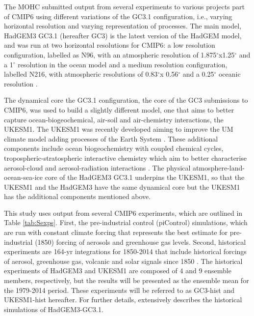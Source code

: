 The MOHC submitted output from several experiments to various projects part of CMIP6 using different variations of the GC3.1 configuration, i.e., varying horizontal resolution and varying representation of processes. 
The main model, HadGEM3 GC3.1 (hereafter GC3) is the latest version of the HadGEM model, and was run at two horizontal resolutions for CMIP6: a low resolution configuration, labelled as N96, with an atmospheric resolution of 1.875$^\circ$x1.25$^\circ$ and a 1$^\circ$ resolution in the ocean model and a medium resolution configuration, labelled N216, with atmospheric resolutions of 0.83$^\circ$x 0.56$^\circ$ and a 0.25$^\circ$ oceanic resolution \citep{menary2018}. 

The dynamical core the GC3.1 configuration, the core of the GC3 submissions to CMIP6, was used to build a slightly different model, one that aims to better capture ocean-biogeochemical, air-soil and air-chemistry interactions, the UKESM1. 
The UKESM1 was recently developed aiming to improve the UM climate model adding processes of the Earth System \citep{sellar2019}. These additional components include ocean biogeochemistry with coupled chemical cycles, tropospheric-stratospheric interactive chemistry which aim to better characterise aerosol-cloud and aerosol-radiation interactions \citep{mulcahy2018,sellar2019}.
The physical atmosphere-land-ocean-sea-ice core of the HadGEM3 GC3.1 underpins the UKESM1, so that the UKESM1 and the HadGEM3 have the same dynamical core but the UKESM1 has the additional components mentioned above.



This study uses output from several CMIP6 experiments, which are outlined in Table \ref{tab:Sexps}. First, the pre-industrial control (piControl) simulations, which are run with constant climate forcing that represents the best estimate for pre-industrial (1850) forcing of aerosols and greenhouse gas levels. Second, historical experiments are 164-yr integrations for 1850-2014 that include historical forcings of aerosol, greenhouse gas, volcanic and solar signals since 1850 \citep{eyring2016,andrews2019}. 
The historical experiments of HadGEM3 and UKESM1 are composed of 4 and 9 ensemble members, respectively, but the results will be presented as the ensemble mean for the 1979-2014 period. %
These experiments will be referred to as GC3-hist and UKESM1-hist hereafter.
For further details, \cite{andrews2020} extensively describes the historical simulations of HadGEM3-GC3.1. %

